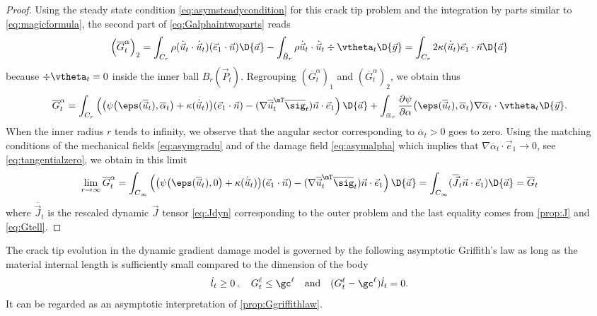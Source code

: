 \begin{proof}
Using the steady state condition \eqref{eq:asymsteadycondition} for this crack tip problem and the integration by parts similar to \eqref{eq:magicformula}, the second part of \eqref{eq:Galphaintwoparts} reads
\[
\left(\overline{G}^\alpha_t\right)_2=\int_{C_r}\rho(\dot{\vec{u}}_t\cdot\dot{\vec{u}}_t)(\vec{e}_1\cdot\vec{n})\D{\vec{a}}-\int_{\tilde{B}_r}\rho\dot{\vec{u}}_t\cdot\dot{\vec{u}}_t\div\vtheta_t\D{\vec{y}}=\int_{C_r}2\kappa(\dot{\vec{u}}_t)\vec{e}_1\cdot\vec{n}\D{\vec{a}}
\]
because $\div\vtheta_t=0$ inside the inner ball $B_r(\vec{P}_t)$. Regrouping $\left(\overline{G}^\alpha_t\right)_1$ and $\left(\overline{G}^\alpha_t\right)_2$, we obtain thus
\[
\overline{G}^\alpha_t=\int_{C_r}\left(\bigl(\psi\bigl(\eps(\overline{\vec{u}}_t),\overline{\alpha}_t\bigr)+\kappa(\dot{\vec{u}}_t)\bigr)(\vec{e}_1\cdot\vec{n})-(\nabla\overline{\vec{u}}_t^\mT\overline{\sig}_t)\vec{n}\cdot\vec{e}_1\right)\D{\vec{a}}+\int_{\circledcirc_r}\frac{\partial\psi}{\partial\alpha}\bigl(\eps(\overline{\vec{u}}_t),\overline{\alpha}_t\bigr)\nabla\overline{\alpha}_t\cdot\vtheta_t\D{\vec{y}}.
\]
When the inner radius $r$ tends to infinity, we observe that the angular sector corresponding to $\overline{\alpha}_t>0$ goes to zero. Using the matching conditions of the mechanical fields \eqref{eq:asymgradu} and of the damage field \eqref{eq:asymalpha} which implies that $\nabla\overline{\alpha}_t\cdot\vec{e}_1\to 0$, see \eqref{eq:tangentialzero}, we obtain in this limit
\[
\lim_{r\to\infty}\overline{G}^\alpha_t=\int_{C_\infty}\left(\bigl(\psi\bigl(\eps(\overline{\vec{u}}_t),0\bigr)+\kappa(\dot{\vec{u}}_t)\bigr)(\vec{e}_1\cdot\vec{n})-(\nabla\overline{\vec{u}}_t^\mT\overline{\sig}_t)\vec{n}\cdot\vec{e}_1\right)\D{\vec{a}}=\int_{C_\infty}(\overline{\vec{J}}_t\vec{n}\cdot\vec{e}_1)\D{\vec{a}}=\overline{G}_t
\]
where $\overline{\vec{J}}_t$ is the rescaled dynamic $\vec{J}$ tensor \eqref{eq:Jdyn} corresponding to the outer problem and the last equality comes from \cref{prop:J} and \eqref{eq:Gtell}.
\end{proof}

\begin{proposition} \label{prop:whenellpetit}
The crack tip evolution in the dynamic gradient damage model is governed by the following asymptotic Griffith's law as long as the material internal length is sufficiently small compared to the dimension of the body
\[
\dot{l}_t\geq 0\,,\quad G_t^\ell\leq\gc^\ell\quad\text{and}\quad(G_t^\ell-\gc^\ell)\dot{l}_t=0.
\]
It can be regarded as an asymptotic interpretation of \cref{prop:Ggriffithlaw}.
\end{proposition}

